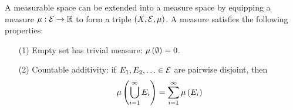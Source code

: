 A measurable space can be extended into a measure space by equipping a
measure \(\mu : \mathcal{E} \to \mathbb{R}\) to form a triple
\(\left(X, \mathcal{E}, \mu\right)\).
A measure satisfies the following properties:
\begin{enumerate}
  \item[(1)]
    Empty set has trivial measure: \(\mu\left(\emptyset\right) = 0\).

  \item[(2)]
    Countable additivity:
    if \(E_1, E_2, \ldots \in \mathcal{E}\) are pairwise disjoint, then
    \begin{align*}
      \mu\left(\bigcup_{i = 1}^{\infty} E_i\right)
        = \sum_{i = 1}^{\infty} \mu\left(E_i\right)
    \end{align*}

\end{enumerate}


